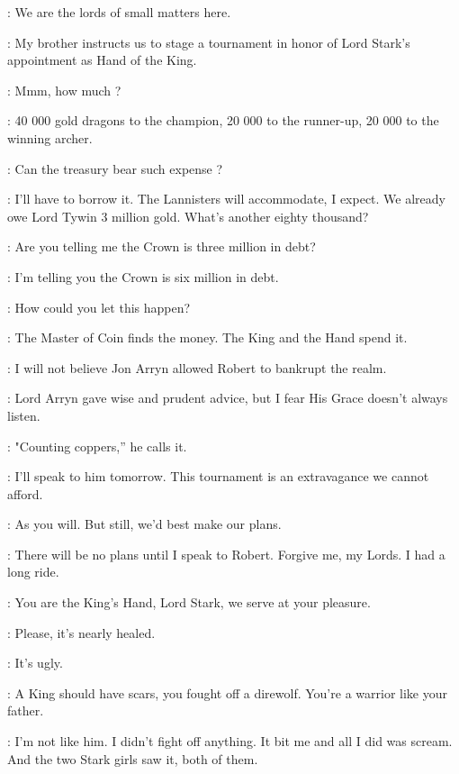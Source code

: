\LITTLEFINGER: We are the lords of small matters here. 

\RENLY: My brother instructs us to stage a tournament in honor of Lord Stark's appointment as Hand of the King. 

\LITTLEFINGER: Mmm, how much ? 

\NED: 40 000 gold dragons to the champion, 20 000 to the runner-up, 20 000 to the winning archer. 

\PYCELLE: Can the treasury bear such expense ? 

\LITTLEFINGER: I'll have to borrow it. The Lannisters will accommodate, I expect. We already owe Lord Tywin 3 million gold. What's another eighty thousand? 

\NED: Are you telling me the Crown is three million in debt? 

\LITTLEFINGER: I'm telling you the Crown is six million in debt. 

\NED: How could you let this happen? 

\LITTLEFINGER: The Master of Coin finds the money. The King and the Hand spend it. 

\NED: I will not believe Jon Arryn allowed Robert to bankrupt the realm. 

\PYCELLE: Lord Arryn gave wise and prudent advice, but I fear His Grace doesn't always listen. 

\RENLY: "Counting coppers,'' he calls it. 

\NED: I'll speak to him tomorrow. This tournament is an extravagance we cannot afford. 

\LITTLEFINGER: As you will. But still, we'd best make our plans. 

\NED: There will be no plans until I speak to Robert. Forgive me, my Lords. I had a long ride. 

\VARYS: You are the King's Hand, Lord Stark, we serve at your pleasure. 

\scene



\CERSEI: Please, it's nearly healed. 

\JOFFREY: It's ugly. 

\CERSEI: A King should have scars, you fought off a direwolf. You're a warrior like your father. 

\JOFFREY: I'm not like him. I didn't fight off anything. It bit me and all I did was scream. And the two Stark girls saw it, both of them. 

